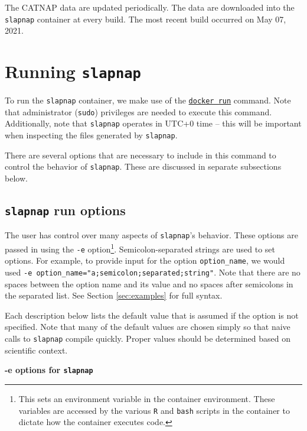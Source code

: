 \documentclass[]{article}
\begin{document}
The CATNAP data are updated periodically. The data are downloaded into
the \texttt{slapnap} container at every build. The most recent build
occurred on May 07, 2021.

\section{\texorpdfstring{Running
\texttt{slapnap}}{Running slapnap}}\label{sec:runningcontainer}

To run the \texttt{slapnap} container, we make use of the
\href{https://docs.docker.com/engine/reference/run/}{\texttt{docker\ run}}
command. Note that administrator (\texttt{sudo}) privileges are needed
to execute this command. Additionally, note that \texttt{slapnap}
operates in UTC+0 time -- this will be important when inspecting the
files generated by \texttt{slapnap}.

There are several options that are necessary to include in this command
to control the behavior of \texttt{slapnap}. These are discussed in
separate subsections below.

\subsection{\texorpdfstring{\texttt{slapnap} run
options}{slapnap run options}}\label{sec:opts}

The user has control over many aspects of \texttt{slapnap}'s behavior.
These options are passed in using the \texttt{-e} option\footnote{This
  sets an environment variable in the container environment. These
  variables are accessed by the various \texttt{R} and \texttt{bash}
  scripts in the container to dictate how the container executes code.}.
Semicolon-separated strings are used to set options. For example, to
provide input for the option \texttt{option\_name}, we would used
\texttt{-e\ option\_name="a;semicolon;separated;string"}. Note that
there are no spaces between the option name and its value and no spaces
after semicolons in the separated list. See Section \ref{sec:examples}
for full syntax.

Each description below lists the default value that is assumed if the
option is not specified. Note that many of the default values are chosen
simply so that naive calls to \texttt{slapnap} compile quickly. Proper
values should be determined based on scientific context.

\textbf{-e options for \texttt{slapnap}}
\end{document}
